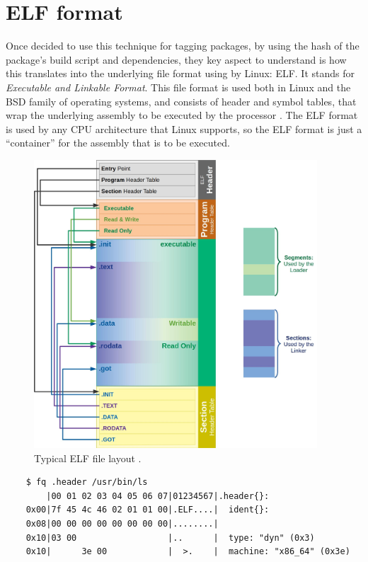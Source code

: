 \FloatBarrier
\section{ELF format}
\label{sec:elf-format}

Once decided to use this technique for tagging packages, by
using the hash of the package's build script and
dependencies, they key aspect to understand is how this
translates into the underlying file format using by Linux:
ELF. It stands for \textit{Executable and Linkable Format}.
This file format is used both in Linux and the BSD family of
operating systems, and consists of header and symbol tables,
that wrap the underlying assembly to be executed by the
processor \cite{LinuxFoundationReferenced}. The ELF format
is used by any CPU architecture that Linux supports, so the
ELF format is just a ``container'' for the assembly that is
to be executed.

\begin{figure}[hbt]
    \centerfloat
    \includegraphics[width=300pt]{assets/typical_elf.jpg}
    \caption{Typical ELF file layout \cite{HW3238POperating}.}
    \label{fig:elf-layout}
\end{figure}


    \begin{verbatim}
    $ fq .header /usr/bin/ls
        |00 01 02 03 04 05 06 07|01234567|.header{}:
    0x00|7f 45 4c 46 02 01 01 00|.ELF....|  ident{}:
    0x08|00 00 00 00 00 00 00 00|........|
    0x10|03 00                  |..      |  type: "dyn" (0x3)
    0x10|      3e 00            |  >.    |  machine: "x86_64" (0x3e)
    \end{verbatim}


